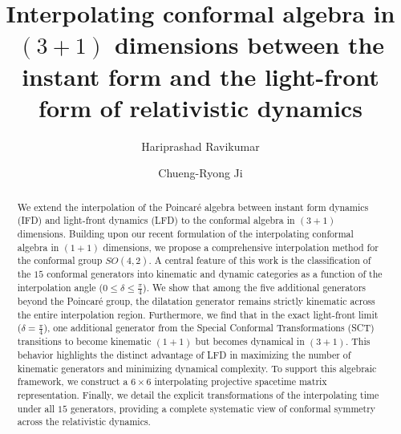 \documentclass[%
 reprint,
superscriptaddress,
 amsmath,amssymb,
 aps,
]{revtex4-2}
\begin{document}

\title{Interpolating conformal algebra in \texorpdfstring{$(3+1)$}{TEXT} dimensions between the instant form and the light-front form of relativistic dynamics}

\author{Hariprashad Ravikumar}

\author{Chueng-Ryong Ji}


\begin{abstract}
We extend the interpolation of the Poincar\'e algebra between instant form dynamics (IFD) and light-front dynamics (LFD) to the conformal algebra in $(3+1)$ dimensions. Building upon our recent formulation of the interpolating conformal algebra in $(1+1)$ dimensions, we propose a comprehensive interpolation method for the conformal group $SO(4,2)$. A central feature of this work is the classification of the $15$ conformal generators into kinematic and dynamic categories as a function of the interpolation angle ($0 \leq \delta \leq \frac{\pi}{4}$). We show that among the five additional generators beyond the Poincar\'e group, the dilatation generator remains strictly kinematic across the entire interpolation region. Furthermore, we find that in the exact light-front limit ($\delta = \frac{\pi}{4}$), one additional generator from the Special Conformal Transformations (SCT) transitions to become kinematic $(1+1)$ but becomes dynamical in $(3+1)$. This behavior highlights the distinct advantage of LFD in maximizing the number of kinematic generators and minimizing dynamical complexity. To support this algebraic framework, we construct a $6 \times 6$ interpolating projective spacetime matrix representation. Finally, we detail the explicit transformations of the interpolating time under all $15$ generators, providing a complete systematic view of conformal symmetry across the relativistic dynamics.
\end{abstract}
\end{document}

